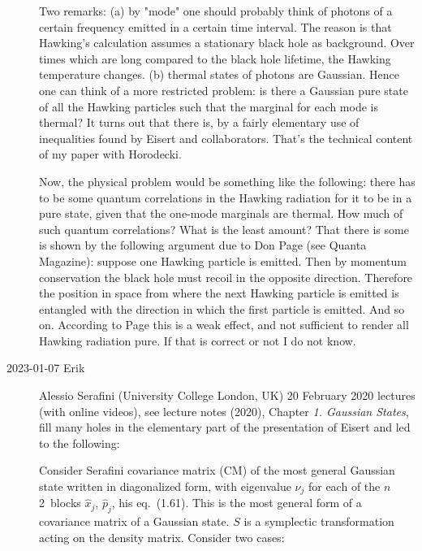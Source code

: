 \begin{description}
Two remarks: (a) by "mode" one should probably think of photons of a certain
frequency emitted in a certain time interval. The reason is that Hawking's
calculation assumes a stationary black hole as background. Over times which
are long compared to the black hole lifetime, the Hawking temperature
changes. (b) thermal states of photons are Gaussian. Hence one can think of a
more restricted problem: is there a Gaussian pure state of all the Hawking
particles such that the marginal for each mode is thermal? It turns out that
there is, by a fairly elementary use of inequalities found by Eisert and
collaborators. That's the technical content of my paper with
Horodecki.

Now, the physical problem would be something like the following: there has to
be some quantum correlations in the Hawking radiation for it to be in a pure
state, given that the one-mode marginals are thermal. How much of such
quantum correlations? What is the least amount? That there is some is shown
by the following argument due to Don Page
(see 
{Quanta Magazine}): suppose one Hawking particle is
emitted. Then by momentum conservation the black hole must recoil in the
opposite direction. Therefore the position in space from where the next
Hawking particle is emitted is entangled with the direction in which the
first particle is emitted. And so on. According to Page this is a weak
effect, and not sufficient to render all Hawking radiation pure. If that is
correct or not I do not know.

\item[2023-01-07 Erik]
{Alessio Serafini} (University College London, UK)
{20 February 2020 lectures}
(with  online videos),
see
{lecture notes} (2020), Chapter {\em 1. Gaussian States},
fill many holes in the elementary part of the presentation of
Eisert\etal{} and led to the following:

Consider Serafini
covariance matrix (CM) of the most general Gaussian state written in
diagonalized form, with eigenvalue $\nu_j$ for each of the $n$ 2\dmn\
blocks $\hat{x}_j$, $\hat{p}_j$, his
eq.~(1.61). This is the most general form of a covariance
matrix of a Gaussian state. $S$ is a symplectic transformation acting on the
density matrix. Consider two cases:


\end{description}
